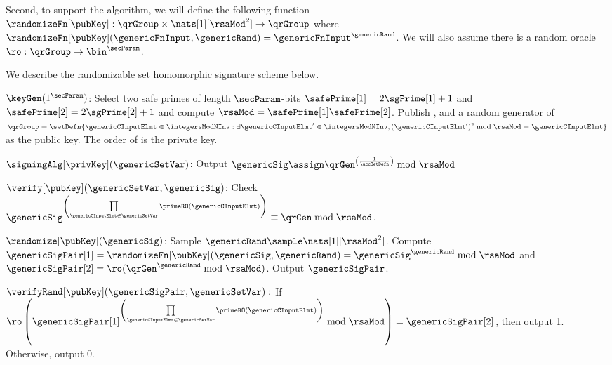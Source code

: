 Second, to support the \randomize algorithm, we will define the following function $\randomizeFn[\pubKey]: 
\qrGroup \times \nats[1][\rsaMod^2] \rightarrow \qrGroup$ 
where $\randomizeFn[\pubKey](\genericFnInput,\genericRand) = \genericFnInput^{\genericRand}$. We will also assume there is a random oracle $\ro: \qrGroup \rightarrow \bin^{\secParam}$. 

We describe the randomizable set homomorphic signature 
scheme \sigScheme below. 

\medskip
\itemListStart

	\item $\keyGen(1^{\secParam})$: Select two safe primes of length 
	$\secParam$-bits $\safePrime[1] = 2 \sgPrime[1] + 1$ and 
	$\safePrime[2] = 2 \sgPrime[2] + 1$ and compute $\rsaMod = \safePrime[1] 
	\safePrime[2]$. Publish \rsaMod, and a random generator \qrGen of $\qrGroup = 
	\setDefn{\genericCInputElmt \in 
		\integersModNInv: \exists \genericCInputElmt' \in \integersModNInv, (\genericCInputElmt')^2 \bmod 
		\rsaMod = \genericCInputElmt}$ as the public key. The order of \qrGroup is the private key.  
	
	
	
	\item $\signingAlg[\privKey](\genericSetVar)$: Output $\genericSig \assign 
	\qrGen^{\left(\frac{1}{\accSetDefn}\right)} \bmod \rsaMod$
	
	
		
	\item $\verify[\pubKey](\genericSetVar, \genericSig)$: Check 
	$\genericSig^{\left(\prod\limits_{\genericCInputElmt \in \genericSetVar} 
	\primeRO(\genericCInputElmt)\right)} \equiv \qrGen \bmod 
	\rsaMod$.
			
	\item $\randomize[\pubKey](\genericSig)$: Sample $\genericRand \sample \nats[1][\rsaMod^2]$. 
	Compute $\genericSigPair[1] = \randomizeFn[\pubKey](\genericSig, \genericRand) = 
	\genericSig^{\genericRand} \bmod \rsaMod$ and $\genericSigPair[2] = 
	\ro(\qrGen^{\genericRand} \bmod \rsaMod)$. Output $\genericSigPair$.
	
	
	\item $\verifyRand[\pubKey](\genericSigPair, \genericSetVar):$ If
	$\ro\left(\genericSigPair[1]^{\left(\prod\limits_{\genericCInputElmt \in \genericSetVar} 
		\primeRO(\genericCInputElmt)\right)} \bmod \rsaMod\right) = \genericSigPair[2]$, then 
		output 1. Otherwise, output 0. 
		
